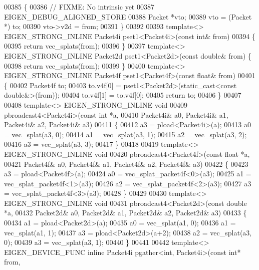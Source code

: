 \begin{DoxyCode}
{00385 \{
00386   \textcolor{comment}{// FIXME: No intrinsic yet}
00387   EIGEN\_DEBUG\_ALIGNED\_STORE
00388   Packet *vto;
00389   vto = (Packet *) to;
00390   vto->v2d = from;
00391 \}
00392 
00393 \textcolor{keyword}{template}<> EIGEN\_STRONG\_INLINE Packet4i pset1<Packet4i>(\textcolor{keyword}{const} \textcolor{keywordtype}{int}&    from)
00394 \{
00395   \textcolor{keywordflow}{return} vec\_splats(from);
00396 \}
00397 \textcolor{keyword}{template}<> EIGEN\_STRONG\_INLINE Packet2d pset1<Packet2d>(\textcolor{keyword}{const} \textcolor{keywordtype}{double}& from) \{
00398   \textcolor{keywordflow}{return} vec\_splats(from);
00399 \}
00400 \textcolor{keyword}{template}<> EIGEN\_STRONG\_INLINE Packet4f pset1<Packet4f>(\textcolor{keyword}{const} \textcolor{keywordtype}{float}&    from)
00401 \{
00402   Packet4f to;
00403   to.v4f[0] = pset1<Packet2d>(\textcolor{keyword}{static\_cast<}\textcolor{keyword}{const }\textcolor{keywordtype}{double}&\textcolor{keyword}{>}(from));
00404   to.v4f[1] = to.v4f[0];
00405   \textcolor{keywordflow}{return} to;
00406 \}
00407 
00408 \textcolor{keyword}{template}<> EIGEN\_STRONG\_INLINE \textcolor{keywordtype}{void}
00409 pbroadcast4<Packet4i>(\textcolor{keyword}{const} \textcolor{keywordtype}{int} *a,
00410                       Packet4i& a0, Packet4i& a1, Packet4i& a2, Packet4i& a3)
00411 \{
00412   a3 = pload<Packet4i>(a);
00413   a0 = vec\_splat(a3, 0);
00414   a1 = vec\_splat(a3, 1);
00415   a2 = vec\_splat(a3, 2);
00416   a3 = vec\_splat(a3, 3);
00417 \}
00418 
00419 \textcolor{keyword}{template}<> EIGEN\_STRONG\_INLINE \textcolor{keywordtype}{void}
00420 pbroadcast4<Packet4f>(\textcolor{keyword}{const} \textcolor{keywordtype}{float} *a,
00421                       Packet4f& a0, Packet4f& a1, Packet4f& a2, Packet4f& a3)
00422 \{
00423   a3 = pload<Packet4f>(a);
00424   a0 = vec\_splat\_packet4f<0>(a3);
00425   a1 = vec\_splat\_packet4f<1>(a3);
00426   a2 = vec\_splat\_packet4f<2>(a3);
00427   a3 = vec\_splat\_packet4f<3>(a3);
00428 \}
00429 
00430 \textcolor{keyword}{template}<> EIGEN\_STRONG\_INLINE \textcolor{keywordtype}{void}
00431 pbroadcast4<Packet2d>(\textcolor{keyword}{const} \textcolor{keywordtype}{double} *a,
00432                       Packet2d& a0, Packet2d& a1, Packet2d& a2, Packet2d& a3)
00433 \{
00434   a1 = pload<Packet2d>(a);
00435   a0 = vec\_splat(a1, 0);
00436   a1 = vec\_splat(a1, 1);
00437   a3 = pload<Packet2d>(a+2);
00438   a2 = vec\_splat(a3, 0);
00439   a3 = vec\_splat(a3, 1);
00440 \}
00441 
00442 \textcolor{keyword}{template}<> EIGEN\_DEVICE\_FUNC \textcolor{keyword}{inline} Packet4i pgather<int, Packet4i>(\textcolor{keyword}{const} \textcolor{keywordtype}{int}* from, 
}
\end{DoxyCode}
